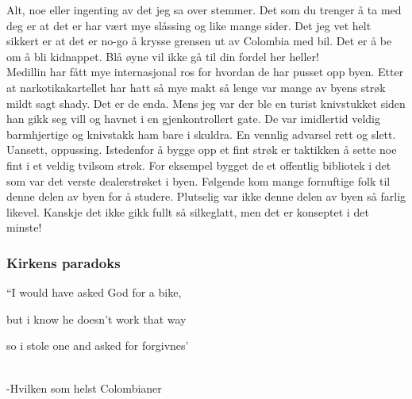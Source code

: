 Alt, noe eller ingenting av det jeg sa over stemmer. Det som du
trenger å ta med deg er at det er har vært mye slåssing og like mange
sider. Det jeg vet helt sikkert er at det er no-go å krysse grensen ut
av Colombia med bil. Det er å be
om å bli kidnappet. Blå øyne vil ikke gå til din fordel her heller!\\

Medillin har fått mye internasjonal ros for hvordan de har pusset opp byen.
Etter at narkotikakartellet har hatt så mye makt så lenge var mange av
byens strøk mildt sagt shady. Det er de enda. Mens jeg var der ble en
turist knivstukket siden han gikk seg vill og havnet i en
gjenkontrollert gate. De var imidlertid veldig barmhjertige og
knivstakk ham bare i skuldra. En vennlig advarsel rett og slett.
Uansett, oppussing. Istedenfor å bygge opp et fint strøk er taktikken
å sette noe fint i et veldig tvilsom strøk. For eksempel
bygget de et offentlig bibliotek i det som var det verste
dealerstrøket i byen. Følgende kom mange fornuftige folk til denne
delen av byen for å studere. Plutselig var ikke denne delen av byen så
farlig likevel. Kanskje det ikke gikk fullt så silkeglatt, men det er
konseptet i det minste!
\subsubsection{Kirkens paradoks}

\begin{dialogue}
	\item ``I would have asked God for a bike,
	\item but i know he doesn't work that way
	\item so i stole one and asked for forgivnes'
\end{dialogue}\\ -Hvilken som helst Colombianer

